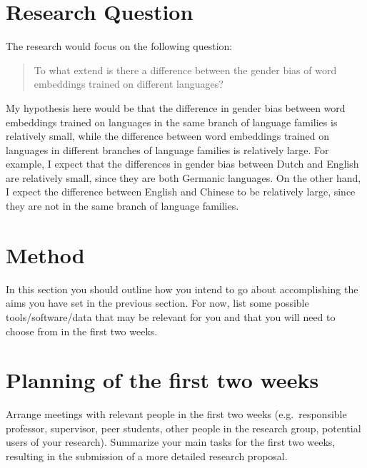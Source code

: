 \documentclass[english, a4paper, 11pt]{article}
\begin{document}
\section*{Research Question}
The research would focus on the following question:

\begin{quote}
    To what extend is there a difference between the gender bias of word embeddings
    trained on different languages?
\end{quote}

My hypothesis here would be that the difference in gender bias between word embeddings 
trained on languages in the same branch of language families is relatively small, while
the difference between word embeddings trained on languages in different branches of
language families is relatively large.
For example, I expect that the differences in gender bias between Dutch and English are
relatively small, since they are both Germanic languages. On the other hand, I expect the
difference between English and Chinese to be relatively large, since they are not in the
same branch of language families.

\section*{Method}
In this section you should outline how you intend to go about accomplishing the aims you have set in the previous section. 
For now, list some possible tools/software/data that may be relevant for you and that you will need to choose from in the first two weeks.


\section*{Planning of the first two weeks}
Arrange meetings with relevant people in the first two weeks (e.g.\ responsible professor, supervisor, peer students, other people in the research group, potential users of your research).
Summarize your main tasks for the first two weeks, resulting in the submission of a more detailed research proposal.

\printbibliography
\end{document}
